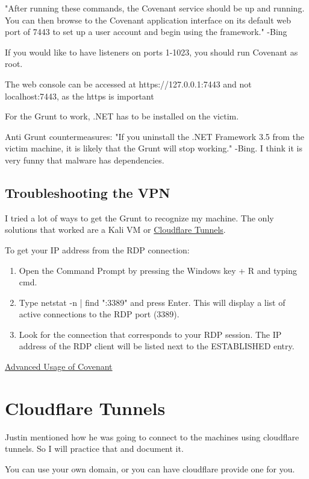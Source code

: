 \documentclass{article}
\begin{document}
"After running these commands, the Covenant service should be up and running. 
You can then browse to the Covenant application interface on its default web port of 
7443 to set up a user account and begin using the framework." -Bing

If you would like to have listeners on ports 1-1023, you should run Covenant as root.

The web console can be accessed at https://127.0.0.1:7443 and not localhost:7443, as the https is important

For the Grunt to work, .NET has to be installed on the victim.

Anti Grunt countermeasures:
"If you uninstall the .NET Framework 3.5 from the victim machine, 
it is likely that the Grunt will stop working." -Bing.
I think it is very funny that malware has dependencies.

\subsection{Troubleshooting the VPN}
I tried a lot of ways to get the Grunt to recognize my machine.
The only solutions that worked are a Kali VM or \href{sec:CloudflareTunnels}{Cloudflare Tunnels}.

To get your IP address from the RDP connection:
\begin{enumerate}
\item Open the Command Prompt by pressing the Windows key + R and typing cmd.
\item Type netstat -n | find ":3389" and press Enter. This will display a list of active connections to the RDP port (3389).
\item Look for the connection that corresponds to your RDP session. The IP address of the RDP client will be listed next to the ESTABLISHED entry.
\end{enumerate}

\href{https://youtu.be/Fi0jXm8VOFU}{Advanced Usage of Covenant}

\section{Cloudflare Tunnels}
\label{sec:CloudflareTunnels}

Justin mentioned how he was going to connect to the machines using cloudflare tunnels. So I will practice that and document it.

You can use your own domain, or you can have cloudflare provide one for you.
\end{document}
